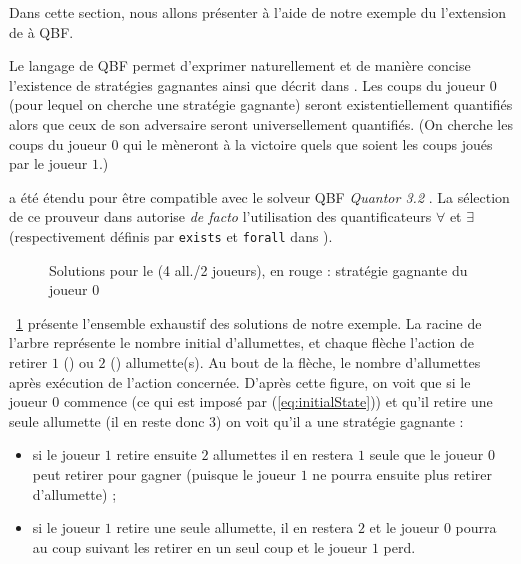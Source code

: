 Dans cette section, nous allons présenter à l'aide de notre exemple du \game l'extension de \touist à QBF.

Le langage de QBF permet d'exprimer naturellement et de manière concise l'existence de stratégies gagnantes ainsi que décrit dans \cite{DBLP:series/txtcs/KroeningS16}. Les coups du joueur 0 (pour lequel on cherche une stratégie gagnante) seront existentiellement quantifiés alors que ceux de son adversaire seront universellement quantifiés. (On cherche les coups du joueur $0$ qui le mèneront à la victoire quels que soient les coups joués par le joueur $1$.)

\touist a été étendu pour être compatible avec le solveur QBF \emph{Quantor 3.2} \cite{Biere:2004:RE:2103144.2103150}. La sélection de ce prouveur dans \touist autorise \emph{de facto} l'utilisation des quantificateurs $\forall$ et $\exists$ (respectivement définis par \verb+exists+ et \verb+forall+ dans \touist).

\begin{figure}
\centering

\caption{Solutions pour le \game (4 all./2 joueurs), en rouge : stratégie gagnante du joueur 0}
\label{fig:solutions}
\vspace{-0.5cm}\end{figure}



\figurename~\ref{fig:solutions} présente l'ensemble exhaustif des solutions de notre exemple. La racine de l'arbre représente le nombre initial d'allumettes, et chaque flèche l'action de retirer $1$ () ou $2$ () allumette(s). Au bout de la flèche, le nombre d'allumettes après exécution de l'action concernée. D'après cette figure, on voit que si le joueur $0$ commence (ce qui est imposé par (\ref{eq:initialState})) et qu'il retire une seule allumette (il en reste donc 3) on voit qu'il a une stratégie gagnante : 
\begin{itemize}
\item si le joueur $1$ retire ensuite $2$ allumettes il en restera $1$ seule que le joueur $0$ peut retirer pour gagner (puisque le joueur $1$ ne pourra ensuite plus retirer d'allumette) ;

\item si le joueur $1$ retire une seule allumette, il en restera  $2$ et le joueur $0$ pourra au coup suivant les retirer en un seul coup et le joueur $1$ perd.
\end{itemize}

